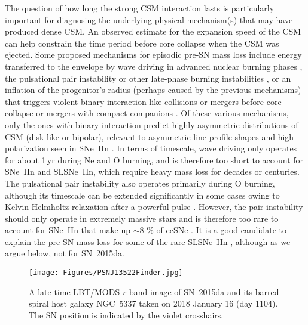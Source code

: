 \documentclass[fleqn,usenatbib,useAMS]{mnras}
\begin{document}
The question of how long the strong CSM interaction lasts is
particularly important for diagnosing the underlying physical mechanism(s) that
may have produced dense CSM.  An observed estimate for
the expansion speed of the CSM can help constrain the time
period before core collapse when the CSM was ejected.  Some proposed 
mechanisms for episodic pre-SN mass loss include
energy transferred to the envelope by wave driving in advanced nuclear
burning phases \citep{qs12,sq14,fuller17,fr18,wf21}, the pulsational pair
instability or other late-phase burning instabilities
\citep{woosley07,woosley17,am11,sa14,renzo20}, or an inflation of the
progenitor's radius (perhaps caused by the previous mechanisms) that
triggers violent binary interaction like collisions or mergers before
core collapse \citep{sa14} or mergers with compact companions
\citep{fw98,schroder20}.  Of these various mechanisms, only the ones with binary interaction predict highly
asymmetric distributions of CSM (disk-like or bipolar), relevant to
asymmetric line-profile shapes and high polarization seen in SNe~IIn
\citep{bilinski23}.  In terms of timescale, wave driving only operates
for about 1\,yr during Ne and O burning, and is therefore too short to
account for SNe~IIn and SLSNe~IIn, which require heavy mass loss for
decades or centuries.  The pulsational
pair instability also operates primarily during O burning, although
its timescale can be extended significantly in some cases owing to
Kelvin-Helmholtz relaxation after a powerful pulse
\citep{woosley17,renzo20}. However, the pair instability should only
operate in extremely massive stars and is therefore too rare to
account for SNe~IIn that make up $\sim$8 \% of ccSNe
\citep{smith11frac}.  It is a good candidate to explain the
pre-SN mass loss for some of the rare SLSNe~IIn \citep{woosley07}, 
although as we argue below, not for SN~2015da.



\begin{figure}
\begin{center}\texttt{[image: Figures/PSNJ13522Finder.jpg]}
\end{center}
\caption{A late-time LBT/MODS $r$-band image of SN~2015da and its barred spiral host galaxy NGC~5337 taken on 2018 January 16 (day 1104).  The SN position is indicated by the violet crosshairs.}
\label{fig:finder}
\end{figure}
\end{document}

